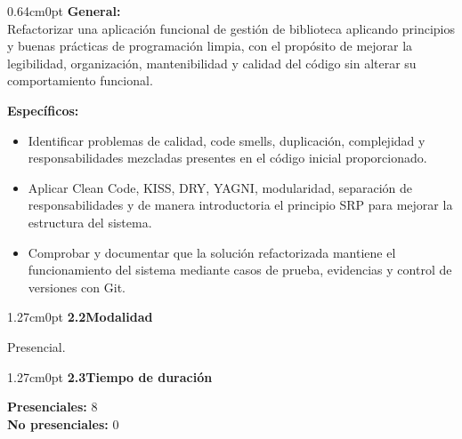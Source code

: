 \documentclass[12pt,letterpaper]{article}
\begin{document}
\vspace{4pt}

\begin{adjustwidth}{0.64cm}{0pt}
\textbf{General:}\\[2pt]
Refactorizar una aplicaci\'on funcional de gesti\'on de biblioteca aplicando principios y buenas pr\'acticas de programaci\'on limpia, con el prop\'osito de mejorar la legibilidad, organizaci\'on, mantenibilidad y calidad del c\'odigo sin alterar su comportamiento funcional.

\vspace{4pt}
\textbf{Espec\'ificos:}
\end{adjustwidth}

\begin{itemize}[leftmargin=1.27cm, label=\textbullet, topsep=2pt, itemsep=0pt, parsep=0pt]
  \item Identificar problemas de calidad, code smells, duplicaci\'on, complejidad y responsabilidades mezcladas presentes en el c\'odigo inicial proporcionado.
  \item Aplicar Clean Code, KISS, DRY, YAGNI, modularidad, separaci\'on de responsabilidades y de manera introductoria el principio SRP para mejorar la estructura del sistema.
  \item Comprobar y documentar que la soluci\'on refactorizada mantiene el funcionamiento del sistema mediante casos de prueba, evidencias y control de versiones con Git.
\end{itemize}

\vspace{6pt}

\begin{adjustwidth}{1.27cm}{0pt}
\textbf{2.2\enspace Modalidad}
\end{adjustwidth}

\vspace{2pt}
\noindent Presencial.

\vspace{6pt}

\begin{adjustwidth}{1.27cm}{0pt}
\textbf{2.3\enspace Tiempo de duraci\'on}
\end{adjustwidth}

\vspace{2pt}
\noindent\textbf{Presenciales: }8\\[1pt]
\noindent\textbf{No presenciales: }0
\end{document}
